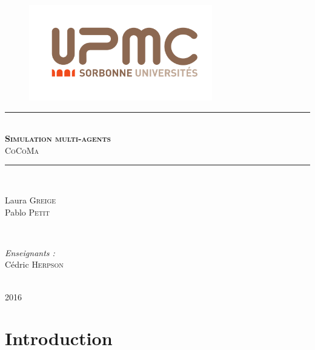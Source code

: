 \documentclass[11pt, letterpaper]{article}
\newcommand{\hmark}{\rule{\linewidth}{0.5mm}}
\begin{document}
\pagestyle{fancy}
\renewcommand{\headrulewidth}{1pt}
\rhead{}

\begin{titlepage}

\centering

\begin{figure}[t]
\begin{center}
\includegraphics[width=8cm]{upmc.png}
\end{center}
\end{figure}

\hmark \\[0.5cm]
\textsc{\textbf{\Large Simulation multi-agents}} \\[0.5cm]
\textsc{CoCoMa} \\[0.5cm]
\hmark \\[5cm]

\begin{minipage}{0.4\textwidth}
\begin{flushleft}
Laura \textsc{Greige}\\
Pablo \textsc{Petit}
\end{flushleft}
\end{minipage}
~
\begin{minipage}{0.4\textwidth}
\begin{flushright} \large
\emph{Enseignants :}\\
Cédric \textsc{Herpson}
\end{flushright}
\end{minipage}\\[4cm]

\large 2016

\end{titlepage}

\newpage

\tableofcontents

\newpage


\section*{Introduction}
\end{document}
